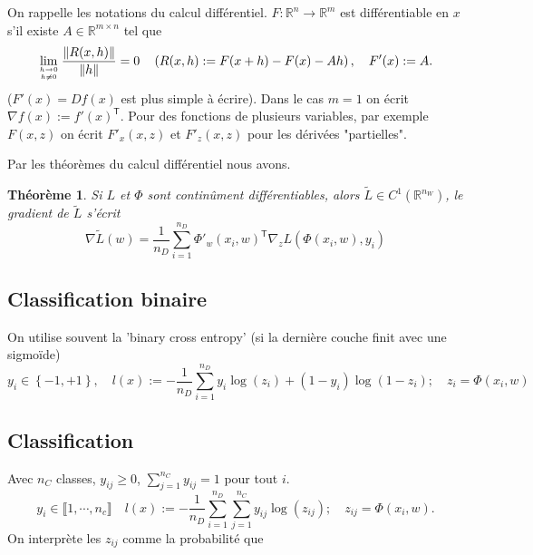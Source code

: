 \documentclass[11pt,a4paper, french]{article}
\newcommand{\nparammodel}{n_W}
\newcommand{\ndata}{n_D}
\newcommand{\R}{\mathbb R}
\newcommand{\norm}[1]{\|#1\|}
\newcommand{\Set}[1]{\left\{#1\right\}}
\newcommand{\transpose}[1]{{#1}^{\mathsf{T}}}
\newtheorem{theorem}{Théorème}[section]
\begin{document}
%
On rappelle les notations du calcul différentiel. $F:\R^n\to\R^m$ est différentiable en $x$ s'il existe $A\in\R^{m\times n}$ tel que 
\begin{align*}
\lim_{h\to 0\atop h\ne0}\frac{\norm{R(x,h)}}{\norm{h}} = 0\quad \left(R(x,h) := F(x+h)-F(x) - Ah\right),\quad F'(x) := A.
\end{align*}
($F'(x)= Df(x)$ est plus simple à écrire).
Dans le cas $m=1$ on écrit $\nabla f(x) := \transpose{f'(x)}$. Pour des fonctions de plusieurs variables, par exemple $F(x,z)$ on écrit 
$F'_x(x,z)$ et $F'_z(x,z)$ pour les dérivées  "partielles".

Par les théorèmes du calcul différentiel nous avons.
%
\begin{theorem}\label{theorem:}
Si $L$ et $\Phi$ sont continûment différentiables, alors   $\widetilde{L}\in C^1(\R^{\nparammodel})$, le gradient de $\widetilde{L}$ s'écrit
%
\begin{equation}\label{equation:}
\nabla  \widetilde{L}(w) = \frac{1}{\ndata}\sum_{i=1}^{\ndata} \transpose{\Phi'_w(x_i,w)}\nabla_z L(\Phi(x_i,w),y_i)
\end{equation}
%
\end{theorem}
%
%
\subsection{Classification binaire}\label{subsec:}
%
On utilise souvent la 'binary cross entropy' (si la dernière couche finit avec une sigmoïde)
%
\begin{equation}\label{equation:}
y_i \in \Set{-1,+1},\quad l(x) := -\frac{1}{\ndata}\sum_{i=1}^{\ndata} y_i\log(z_i)+(1-y_i)\log(1-z_i);\quad z_i = \Phi(x_i,w)
\end{equation}
%
%
\subsection{Classification}\label{subsec:}
%
Avec $n_C$ classes, $y_{ij}\ge0 $, $\sum_{j=1}^{n_C}y_{ij}=1$ pour tout $i$. 
%
\begin{equation}\label{equation:}
y_i \in \llbracket 1,\cdots, n_c\rrbracket \quad l(x) := -\frac{1}{\ndata}\sum_{i=1}^{\ndata}\sum_{j=1}^{n_C} y_{ij}\log(z_{ij});\quad z_{ij} = \Phi(x_i,w).
\end{equation}
%
On interprète les $z_{ij}$ comme la probabilité que 
%
\end{document}
